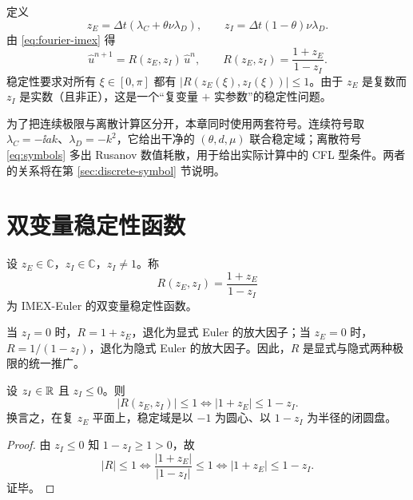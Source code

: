 定义
\begin{equation}
  z_E=\Delta t\left(\lambda_C+\theta\nu\lambda_D\right),
  \qquad
  z_I=\Delta t(1-\theta)\nu\lambda_D.
  \label{eq:zE-zI}
\end{equation}
由 \eqref{eq:fourier-imex} 得
\begin{equation}
  \hat u^{n+1}=R(z_E,z_I)\,\hat u^n,
  \qquad
  R(z_E,z_I)=\frac{1+z_E}{1-z_I}.
  \label{eq:R-def}
\end{equation}
稳定性要求对所有 $\xi\in[0,\pi]$ 都有 $|R(z_E(\xi),z_I(\xi))|\le1$。由于 $z_E$ 是复数而 $z_I$ 是实数（且非正），这是一个“复变量 $+$ 实参数”的稳定性问题。

为了把连续极限与离散计算区分开，本章同时使用两套符号。连续符号取 $\lambda_C=-\ii ak$、$\lambda_D=-k^2$，它给出干净的 $(\theta,d,\mu)$ 联合稳定域；离散符号 \eqref{eq:symbols} 多出 Rusanov 数值耗散，用于给出实际计算中的 CFL 型条件。两者的关系将在第 \ref{sec:discrete-symbol} 节说明。

\section{双变量稳定性函数}
\label{sec:two-var-R}

\begin{definition}[双变量稳定性函数]
  设 $z_E\in\mathbb{C}$，$z_I\in\mathbb{C}$，$z_I\ne1$。称
  \begin{equation}
    R(z_E,z_I)=\frac{1+z_E}{1-z_I}
    \label{eq:R-general}
  \end{equation}
  为 IMEX-Euler 的双变量稳定性函数。
\end{definition}

当 $z_I=0$ 时，$R=1+z_E$，退化为显式 Euler 的放大因子；当 $z_E=0$ 时，$R=1/(1-z_I)$，退化为隐式 Euler 的放大因子。因此，$R$ 是显式与隐式两种极限的统一推广。

\begin{lemma}[稳定域的圆盘表示]
  \label{lem:disk}
  设 $z_I\in\mathbb{R}$ 且 $z_I\le0$。则
  \begin{equation}
    |R(z_E,z_I)|\le1
    \iff
    |1+z_E|\le1-z_I.
    \label{eq:disk-condition}
  \end{equation}
  换言之，在复 $z_E$ 平面上，稳定域是以 $-1$ 为圆心、以 $1-z_I$ 为半径的闭圆盘。
\end{lemma}

\begin{proof}
  由 $z_I\le0$ 知 $1-z_I\ge1>0$，故
  \[
    |R|\le1
    \iff
    \frac{|1+z_E|}{|1-z_I|}\le1
    \iff
    |1+z_E|\le1-z_I.
  \]
  证毕。
\end{proof}

